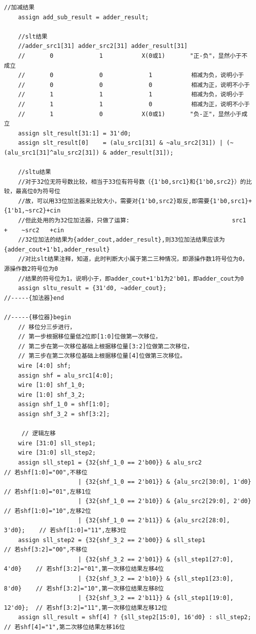 \documentclass[AutoFakeBold]{LZUThesis}
\begin{document}
\begin{lstlisting}[style=verilog-style]
    //加减结果
    assign add_sub_result = adder_result;

    //slt结果
    //adder_src1[31] adder_src2[31] adder_result[31]
    //       0             1           X(0或1)       "正-负"，显然小于不成立
    //       0             0             1           相减为负，说明小于
    //       0             0             0           相减为正，说明不小于
    //       1             1             1           相减为负，说明小于
    //       1             1             0           相减为正，说明不小于
    //       1             0           X(0或1)       "负-正"，显然小于成立
    assign slt_result[31:1] = 31'd0;
    assign slt_result[0]    = (alu_src1[31] & ~alu_src2[31]) | (~(alu_src1[31]^alu_src2[31]) & adder_result[31]);

    //sltu结果
    //对于32位无符号数比较，相当于33位有符号数（{1'b0,src1}和{1'b0,src2}）的比较，最高位0为符号位
    //故，可以用33位加法器来比较大小，需要对{1'b0,src2}取反,即需要{1'b0,src1}+{1'b1,~src2}+cin
    //但此处用的为32位加法器，只做了运算:                             src1   +    ~src2   +cin
    //32位加法的结果为{adder_cout,adder_result},则33位加法结果应该为{adder_cout+1'b1,adder_result}
    //对比slt结果注释，知道，此时判断大小属于第二三种情况，即源操作数1符号位为0，源操作数2符号位为0
    //结果的符号位为1，说明小于，即adder_cout+1'b1为2'b01，即adder_cout为0
    assign sltu_result = {31'd0, ~adder_cout};
//-----{加法器}end

//-----{移位器}begin
    // 移位分三步进行，
    // 第一步根据移位量低2位即[1:0]位做第一次移位，
    // 第二步在第一次移位基础上根据移位量[3:2]位做第二次移位，
    // 第三步在第二次移位基础上根据移位量[4]位做第三次移位。
    wire [4:0] shf;
    assign shf = alu_src1[4:0];
    wire [1:0] shf_1_0;
    wire [1:0] shf_3_2;
    assign shf_1_0 = shf[1:0];
    assign shf_3_2 = shf[3:2];
    
     // 逻辑左移
    wire [31:0] sll_step1;
    wire [31:0] sll_step2;
    assign sll_step1 = {32{shf_1_0 == 2'b00}} & alu_src2                   // 若shf[1:0]="00",不移位
                     | {32{shf_1_0 == 2'b01}} & {alu_src2[30:0], 1'd0}     // 若shf[1:0]="01",左移1位
                     | {32{shf_1_0 == 2'b10}} & {alu_src2[29:0], 2'd0}     // 若shf[1:0]="10",左移2位
                     | {32{shf_1_0 == 2'b11}} & {alu_src2[28:0], 3'd0};    // 若shf[1:0]="11",左移3位
    assign sll_step2 = {32{shf_3_2 == 2'b00}} & sll_step1                  // 若shf[3:2]="00",不移位
                     | {32{shf_3_2 == 2'b01}} & {sll_step1[27:0], 4'd0}    // 若shf[3:2]="01",第一次移位结果左移4位
                     | {32{shf_3_2 == 2'b10}} & {sll_step1[23:0], 8'd0}    // 若shf[3:2]="10",第一次移位结果左移8位
                     | {32{shf_3_2 == 2'b11}} & {sll_step1[19:0], 12'd0};  // 若shf[3:2]="11",第一次移位结果左移12位
    assign sll_result = shf[4] ? {sll_step2[15:0], 16'd0} : sll_step2;     // 若shf[4]="1",第二次移位结果左移16位


\end{lstlisting}
\end{document}
